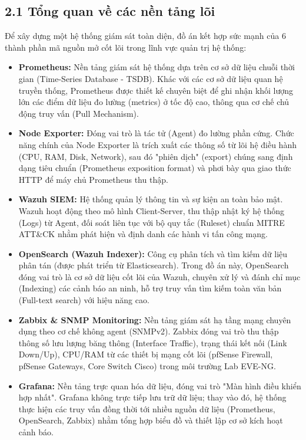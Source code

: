 \documentclass[13pt,a4paper]{extarticle}
\begin{document}
\subsection{2.1 Tổng quan về các nền tảng lõi}
Để xây dựng một hệ thống giám sát toàn diện, đồ án kết hợp sức mạnh của 6 thành phần mã nguồn mở cốt lõi trong lĩnh vực quản trị hệ thống:
\begin{itemize}
    \item \textbf{Prometheus:} Nền tảng giám sát hệ thống dựa trên cơ sở dữ liệu chuỗi thời gian (Time-Series Database - TSDB). Khác với các cơ sở dữ liệu quan hệ truyền thống, Prometheus được thiết kế chuyên biệt để ghi nhận khối lượng lớn các điểm dữ liệu đo lường (metrics) ở tốc độ cao, thông qua cơ chế chủ động truy vấn (Pull Mechanism).
    \item \textbf{Node Exporter:} Đóng vai trò là tác tử (Agent) đo lường phần cứng. Chức năng chính của Node Exporter là trích xuất các thông số từ lõi hệ điều hành (CPU, RAM, Disk, Network), sau đó "phiên dịch" (export) chúng sang định dạng tiêu chuẩn (Prometheus exposition format) và phơi bày qua giao thức HTTP để máy chủ Prometheus thu thập.
    \item \textbf{Wazuh SIEM:} Hệ thống quản lý thông tin và sự kiện an toàn bảo mật. Wazuh hoạt động theo mô hình Client-Server, thu thập nhật ký hệ thống (Logs) từ Agent, đối soát liên tục với bộ quy tắc (Ruleset) chuẩn MITRE ATT\&CK nhằm phát hiện và định danh các hành vi tấn công mạng.
    \item \textbf{OpenSearch (Wazuh Indexer):} Công cụ phân tích và tìm kiếm dữ liệu phân tán (được phát triển từ Elasticsearch). Trong đồ án này, OpenSearch đóng vai trò là cơ sở dữ liệu cốt lõi của Wazuh, chuyên xử lý và đánh chỉ mục (Indexing) các cảnh báo an ninh, hỗ trợ truy vấn tìm kiếm toàn văn bản (Full-text search) với hiệu năng cao.
    \item \textbf{Zabbix \& SNMP Monitoring:} Nền tảng giám sát hạ tầng mạng chuyên dụng theo cơ chế không agent (SNMPv2). Zabbix đóng vai trò thu thập thông số lưu lượng băng thông (Interface Traffic), trạng thái kết nối (Link Down/Up), CPU/RAM từ các thiết bị mạng cốt lõi (pfSense Firewall, pfSense Gateways, Core Switch Cisco) trong môi trường Lab EVE-NG.
    \item \textbf{Grafana:} Nền tảng trực quan hóa dữ liệu, đóng vai trò "Màn hình điều khiển hợp nhất". Grafana không trực tiếp lưu trữ dữ liệu; thay vào đó, hệ thống thực hiện các truy vấn đồng thời tới nhiều nguồn dữ liệu (Prometheus, OpenSearch, Zabbix) nhằm tổng hợp biểu đồ và thiết lập cơ sở kích hoạt cảnh báo.
\end{itemize}
\end{document}
